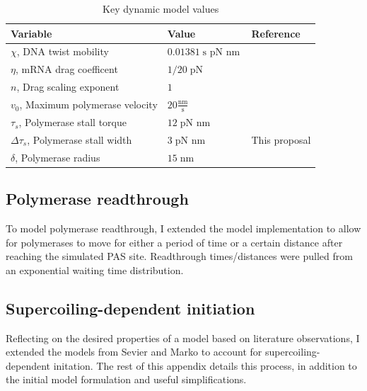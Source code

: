 \documentclass[11pt]{article}
\newcommand{\units}[2]{\frac{\text{#1}}{\text{#2}}\,}
\newcommand{\unit}[1]{\; \text{#1}\,}
\begin{document}
\begin{table}[h]
    \centering
    \begin{tabular}{@{}lll@{}}
        \toprule
        Variable & Value & Reference \\
        \midrule
        \(\chi\), DNA twist mobility  & \(0.01381 \unit{s pN nm}\) & \parencite{sevierPropertiesGeneExpression2018} \\
        \(\eta\), mRNA drag coefficent  & \(1/20 \unit{pN}\) & \parencite{sevierPropertiesGeneExpression2018} \\
        \(n\), Drag scaling exponent  & \(1\) & \parencite{sevierPropertiesGeneExpression2018} \\
        \(v_0\), Maximum polymerase velocity  & \(20 \units{nm}{s}\) & \parencite{sevierPropertiesGeneExpression2018} \\
        \(\tau_s\), Polymerase stall torque  & \(12 \unit{pN nm}\) & \parencite{sevierPropertiesGeneExpression2018} \\
        \(\Delta \tau_s\), Polymerase stall width  & \(3 \unit{pN nm}\) & This proposal \\
        \(\delta\), Polymerase radius  & \(15 \unit{nm}\) & \parencite{sevierPropertiesGeneExpression2018} \\
        \bottomrule
    \end{tabular}
    \caption{Key dynamic model values}
    \label{tab:dynamic_model_constants}
\end{table}

\subsection{Polymerase readthrough}
To model polymerase readthrough, I extended the model implementation to allow for polymerases to move for either a period of time or a certain distance after reaching the simulated PAS site. Readthrough times/distances were pulled from an exponential waiting time distribution.

\subsection{Supercoiling-dependent initiation}
Reflecting on the desired properties of a model based on literature observations, I extended the models from Sevier and Marko to account for supercoiling-dependent initation. The rest of this appendix details this process, in addition to the initial model formulation and useful simplifications.
\end{document}
